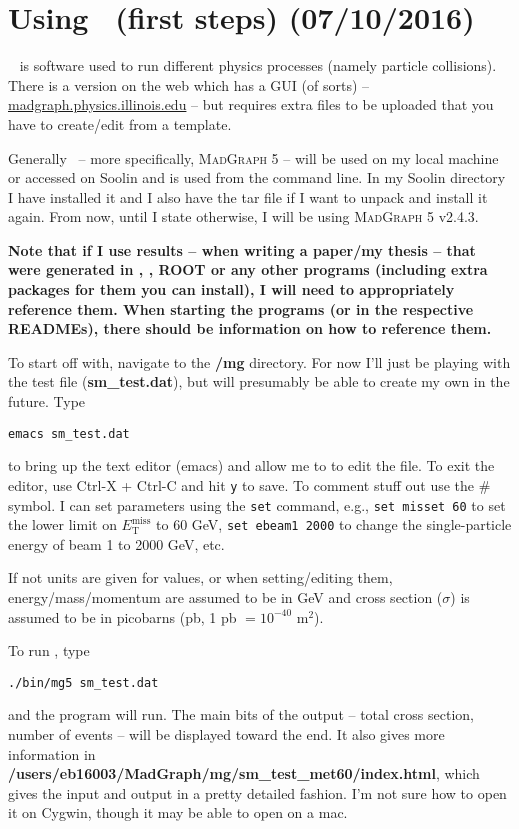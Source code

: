\newpage
\section{Using \madgraph\ (first steps) (07/10/2016)}

\madgraph\ \cite{Alwall:2011madgraph} is software used to run different physics processes (namely particle collisions). There is a version on the web which has a GUI (of sorts) -- \url{madgraph.physics.illinois.edu} -- but requires extra files to be uploaded that you have to create/edit from a template.

Generally \madgraph\ -- more specifically, \textsc{MadGraph 5} -- will be used on my local machine or accessed on Soolin and is used from the command line. In my Soolin directory I have installed it and I also have the tar file if I want to unpack and install it again. From now, until I state otherwise, I will be using \textsc{MadGraph 5} v2.4.3.

\textbf{Note that if I use results -- when writing a paper/my thesis -- that were generated in \madgraph, \madanalysis, ROOT or any other programs (including extra packages for them you can install), I will need to appropriately reference them. When starting the programs (or in the respective READMEs), there should be information on how to reference them.}

To start off with, navigate to the \textbf{/mg} directory. For now I'll just be playing with the test file (\textbf{sm\_test.dat}), but will presumably be able to create my own in the future. Type

\verb!emacs sm_test.dat!

to bring up the text editor (emacs) and allow me to to edit the file. To exit the editor, use Ctrl-X + Ctrl-C and hit \verb!y! to save. To comment stuff out use the \# symbol. I can set parameters using the \verb!set! command, e.g., \verb!set misset 60! to set the lower limit on $E_{\mathrm{T}}^{\mathrm{miss}}$ to 60 GeV, \verb!set ebeam1 2000! to change the single-particle energy of beam 1 to 2000 GeV, etc.

If not units are given for values, or when setting/editing them, energy/mass/momentum are assumed to be in GeV and cross section ($\sigma$) is assumed to be in picobarns (pb, 1 pb $= 10^{-40}$ m$^2$).

To run \madgraph, type

\verb!./bin/mg5 sm_test.dat!

and the program will run. The main bits of the output -- total cross section, number of events -- will be displayed toward the end. It also gives more information in \textbf{/users/eb16003/MadGraph/mg/sm\_test\_met60/index.html}, which gives the input and output in a pretty detailed fashion. I'm not sure how to open it on Cygwin, though it may be able to open on a mac.

